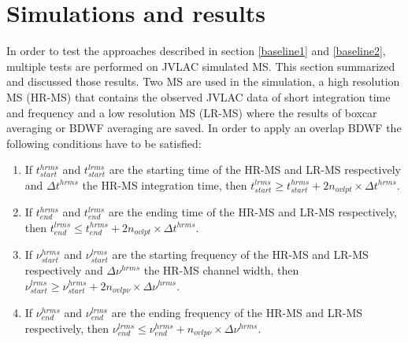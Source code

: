 \documentclass[useAMS,usenatbib]{mn2e}
\begin{document}
\section{Simulations and results}
In order to test the approaches described in section \ref{baseline1} and \ref{baseline2}, multiple tests are performed on JVLAC 
simulated MS. This section summarized and discussed those results. Two MS are used in 
the simulation, a high resolution MS (HR-MS) that contains the observed JVLAC data of short integration time and frequency and a low 
resolution 
MS (LR-MS) where the results of boxcar averaging or BDWF averaging are saved. In order to apply an overlap BDWF  the following 
conditions have to be satisfied:
\begin{enumerate}
 \item If $t^{hrms}_{start}$ and $t^{lrms}_{start}$ are the starting time of the HR-MS and LR-MS respectively and  $\Delta t^{hrms}$ the 
HR-MS integration time, then 
	    $t^{lrms}_{start}\geq t^{hrms}_{start} + 2n_{ovlpt}\times \Delta t^{hrms}$. 
  \item If $t^{hrms}_{end}$ and $t^{lrms}_{end}$ are the ending time of the HR-MS and LR-MS respectively, then 
	    $t^{lrms}_{end}\leq t^{hrms}_{end} + 2n_{ovlpt}\times \Delta t^{hrms}$. 
 \item If $\nu^{hrms}_{start}$ and $\nu^{lrms}_{start}$ are the starting frequency of the HR-MS and LR-MS respectively and  $\Delta 
\nu^{hrms}$ the HR-MS channel width, then 
	    $\nu^{lrms}_{start} \geq \nu^{hrms}_{start} + 2n_{ovlp\nu}\times \Delta \nu^{hrms}$. 
 \item If $\nu^{hrms}_{end}$ and $\nu^{lrms}_{end}$ are the ending frequency of the HR-MS and LR-MS respectively, then 
	    $\nu^{lrms}_{end} \leq \nu^{hrms}_{end} + n_{ovlp\nu}\times \Delta \nu^{hrms}$. 
\end{enumerate}
\end{document}
